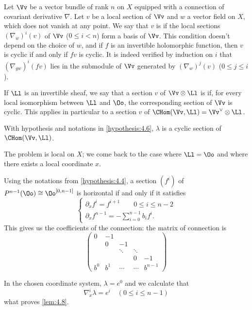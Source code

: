 \begin{para}
  Let $\Vv$ be a vector bundle of rank $n$ on $X$ equipped with a connection of
  covariant derivative $\nabla$. Let $v$ be a local section of $\Vv$ and $w$ a
  vector field on $X$, which does not vanish at any point.
  We say that $v$ is  if the local sections $(\nabla_w)^i(v)$ of
  $\Vv$ ($0\le i< n$) form a basis of $\Vv$.
  This condition doesn't depend on the choice of $w$,
  and if $f$ is an invertible holomorphic function, then
  $v$ is cyclic if and only if $fv$ is cyclic.
  It is indeed verified by induction on $i$ that $(\nabla_{gw})^i(fv)$ lies in
  the submodule of $\Vv$ generated by $(\nabla_{w})^j(v)$ ($0\le j\le i$).

  If $\Ll$ is an invertible sheaf, we say that a section $v$ of $\Vv\otimes\Ll$
  is  if, for every local isomorphism between $\Ll$ and $\Oo$,
  the corresponding section of $\Vv$ is cyclic.
  This applies in particular to a section $v$ of
  $\CHom(\Vv,\Ll)=\Vv^{\vee}\otimes\Ll$.
\end{para}

\begin{lemma}\label{lem:4.8}
  With hypothesis and notations in \ref{hypothesis:4.6},
  $\lambda$ is a cyclic section of $\CHom(\Vv,\Ll)$.
\end{lemma}

The problem is local on $X$; we come back to the case where $\Ll=\Oo$ and where
there exists a local coordinate $x$.

Using the notations from \ref{hypothesis:4.4}, a section $(f^i)$ of
$P^{n-1}(\Oo)\cong\Oo^{[0,n-1]}$ is horizontal if and only if it satisfies
\[
\begin{cases}
  \partial_xf^i = f^{i+1} \qquad 0\le i\le n-2 \\
  \partial_xf^{n-1} = -\sum_{i=0}^{n-1}b_if^i.
\end{cases}
\]
This gives us the coefficients of the connection: the matrix of connection is
\begin{equation}
  \begin{pmatrix}
    0 & -1 & & & \\
    & 0 & -1 & & \\
    &&\ddots&\ddots& \\
    & & & 0 & -1 \\
    b^0 & b^1 &\cdots &\cdots & b^{n-1}
  \end{pmatrix}
\end{equation}

In the chosen coordinate system, $\lambda=e^0$ and we calculate that
\[
\nabla_x^i\lambda = e^i\quad(0\le i\le n-1)
\]
what proves \ref{lem:4.8}.

